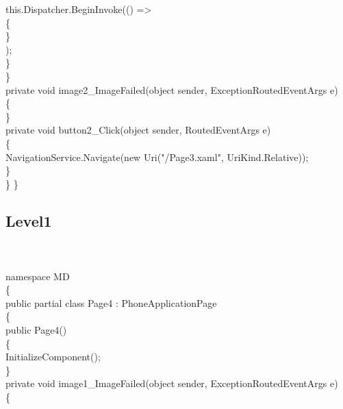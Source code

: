 {{                this.Dispatcher.BeginInvoke(() =>\\
                \{\\
                                            

                \}\\);\\
            \}\\
            
        \}\\

        private void image2_ImageFailed(object sender, ExceptionRoutedEventArgs e)\\
        \{\\

        \}\\

        private void button2_Click(object sender, RoutedEventArgs e)\\
        \{\\
            NavigationService.Navigate(new Uri("/Page3.xaml", UriKind.Relative));\\
        \}\\

        
    \}
\}

\rmfamily



\subsection{Level1}\\
\ttfamily \hspace{1cm}\\


namespace MD\\
\{\\
    public partial class Page4 : PhoneApplicationPage\\
    \{\\
        public Page4()\\
        \{\\
            InitializeComponent();\\
        \}\\
        private void image1_ImageFailed(object sender, ExceptionRoutedEventArgs e)\\
        \{\\

}}

